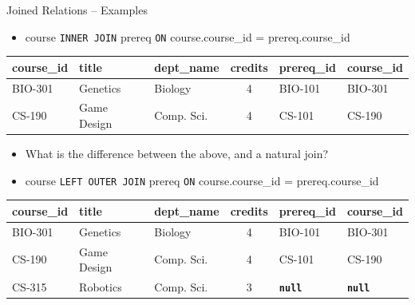 \documentclass{beamer}
\begin{document}
\begin{frame}{Joined Relations – Examples}
    \normalsize
    \begin{itemize}
        \item course \texttt{INNER JOIN} prereq \texttt{ON} course.course\_id = prereq.course\_id
    \end{itemize}
    \scriptsize
    \begin{tabular}{| l | l | l | c | l | l |}
        \hline
        \textbf{course\_id} & \textbf{title} & \textbf{dept\_name} & \textbf{credits} & \textbf{prereq\_id} & \textbf{course\_id} \\
        \hline
        BIO-301 & Genetics    & Biology    & 4 & BIO-101 & BIO-301 \\
        \hline
        CS-190  & Game Design & Comp. Sci. & 4 & CS-101  & CS-190  \\
        \hline
    \end{tabular}
    \normalsize
    \begin{itemize}
        \item What is the difference between the above, and a natural join?
        \vspace{2mm}
        \item course \texttt{LEFT OUTER JOIN} prereq \texttt{ON} course.course\_id = prereq.course\_id
    \end{itemize}
    \scriptsize
    \begin{tabular}{| l | l | l | c | l | l |}
        \hline
        \textbf{course\_id} & \textbf{title} & \textbf{dept\_name} & \textbf{credits} & \textbf{prereq\_id} & \textbf{course\_id} \\
        \hline
        BIO-301 & Genetics    & Biology    & 4 & BIO-101 & BIO-301 \\
        \hline
        CS-190  & Game Design & Comp. Sci. & 4 & CS-101 & CS-190  \\
        \hline
        CS-315  & Robotics    & Comp. Sci. & 3 & \textbf{\texttt{null}} & \textbf{\texttt{null}} \\
        \hline
    \end{tabular}
\end{frame}
\end{document}

